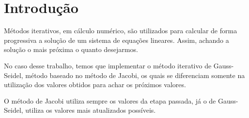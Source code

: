 \section*{Introdução}
Métodos iterativos, em cálculo numérico, são utilizados para calcular de forma progressiva a solução de um sistema de equações lineares. Assim, achando a solução o mais próxima o quanto desejarmos.

No caso desse trabalho, temos que implementar o método iterativo de Gauss-Seidel, método baseado no método de Jacobi, os quais se diferenciam somente na utilização dos valores obtidos para achar os próximos valores.

O método de Jacobi utiliza sempre os valores da etapa passada, já o de Gauss-Seidel, utiliza os valores mais atualizados possíveis.
